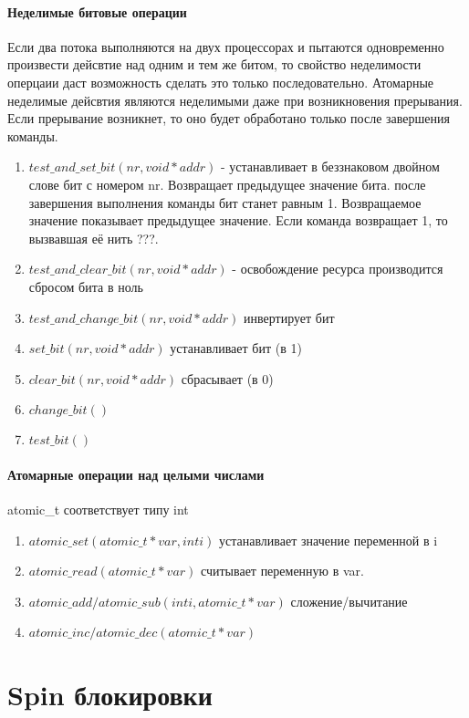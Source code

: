 \paragraph{Неделимые битовые операции}
Если два потока выполняются на двух процессорах и пытаются одновременно произвести дейсвтие над одним и тем же битом, то свойство неделимости оперцаии даст возможность сделать это только последовательно. Атомарные неделимые дейсвтия являются неделимыми даже при возникновения прерывания. Если прерывание возникнет, то оно будет обработано только после завершения команды. 
\begin{enumerate}
	\item $test\_and\_set\_bit(nr, void *addr)$ - устанавливает в беззнаковом двойном слове бит с номером nr. Возвращает предыдущее значение бита. после завершения выполнения команды бит станет равным 1. Возвращаемое значение показывает предыдущее значение. Если команда возвращает 1, то вызвавшая её нить ???.
	\item $test\_and\_clear\_bit(nr, void *addr)$ - освобождение ресурса производится сбросом бита в ноль
	\item $test\_and\_change\_bit(nr, void *addr)$ инвертирует бит
	\item $set\_bit(nr, void *addr)$ устанавливает бит (в 1)
	\item $clear\_bit(nr, void *addr)$ сбрасывает (в 0)
	\item $change\_bit()$
	\item $test\_bit()$
\end{enumerate}

\paragraph{Атомарные операции над целыми числами}
atomic\_t соответствует типу int
\begin{enumerate}
	\item $atomic\_set(atomic\_t *var, int i)$ устанавливает значение переменной в i
	\item $atomic\_read(atomic\_t *var)$ считывает переменную в var.
	\item $atomic\_add / atomic\_sub(int i, atomic\_t *var)$ сложение/вычитание
	\item $atomic\_inc / atomic\_dec(atomic\_t *var)$ 
\end{enumerate}

\section{Spin блокировки}

